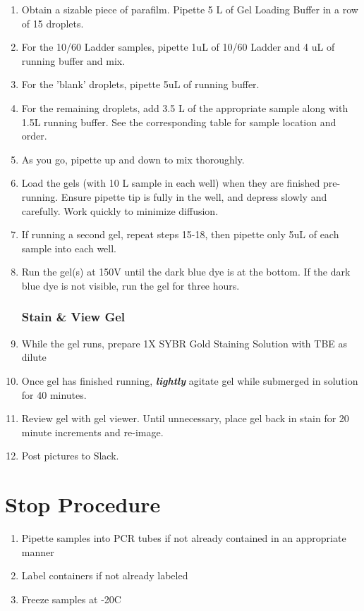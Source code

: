 \documentclass[letterpaper]{article}
\newcommand{\C}{\degree{}C}
\newcommand{\uL}{\micro{}L}
\begin{document}
\begin{enumerate}
\item{Obtain a sizable piece of parafilm. Pipette 5 \uL{} of Gel Loading Buffer in a row of 15 droplets.}
\item{For the 10/60 Ladder samples, pipette 1uL of 10/60 Ladder and 4 uL of running buffer and mix.}
\item{For the 'blank' droplets, pipette 5uL of running buffer.}
\item{For the remaining droplets, add 3.5 \uL{} of the appropriate sample along with 1.5\uL{} running buffer. See the corresponding table for sample location and order.}
\item{As you go, pipette up and down to mix thoroughly.}
\item{Load the gels (with 10 \uL{} sample in each well) when they are finished pre-running. Ensure pipette tip is fully in the well, and depress slowly and carefully. Work quickly to minimize diffusion.}
\item{If running a second gel, repeat steps 15-18, then pipette only 5uL of each sample into each well.}
\item{Run the gel(s) at 150V until the dark blue dye is at the bottom. If the dark blue dye is not visible, run the gel for three hours.}

\subsubsection{Stain \& View Gel}
\item{While the gel runs, prepare 1X SYBR Gold Staining Solution with TBE as dilute}
\item{Once gel has finished running, \textbf{\textit{lightly}} agitate gel while submerged in solution for 40 minutes.}
\item{Review gel with gel viewer. Until unnecessary, place gel back in stain for 20 minute increments and re-image.}
\item{Post pictures to Slack.}\\
\end{enumerate} 

\section*{Stop Procedure}
\begin{enumerate}
\item{Pipette samples into PCR tubes if not already contained in an appropriate manner}
\item{Label containers if not already labeled}
\item{Freeze samples at -20\C{}}
\end{enumerate}
\end{document}
